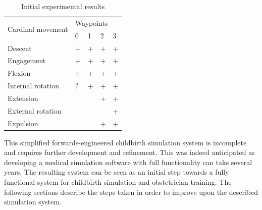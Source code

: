 \begin{table}[h]
\centering
\begin{tabular}{|l|l|l|l|l|}
\hline
\multirow{2}{*}{Cardinal movement} & \multicolumn{4}{l|}{Waypoints} \\ \cline{2-5}
                                   & 0      & 1     & 2     & 3     \\ \hline
Descent                            & +      & +     & +     & +     \\ \hline
Engagement                         & +      & +     & +     & +     \\ \hline
Flexion                            & +      & +     & +     & +     \\ \hline
Internal rotation                  & ?      & +     & +     & +     \\ \hline
Extension                          &        &       & +     & +     \\ \hline
External rotation                  &        &       &       & +     \\ \hline
Expulsion                          &        &       & +     & +     \\ \hline
\end{tabular}
\caption{Initial experimental results} \label{hybrid-table}
\end{table}

This simplified forwards-engineered childbirth simulation system is incomplete and requires further development and refinement. This was indeed anticipated as  developing a medical simulation software with full functionality can take several years. The resulting system can be seen as an initial step towards a fully functional system for childbirth simulation and obstetrician training. The following sections describe the steps taken in order to improve upon the described simulation system.
